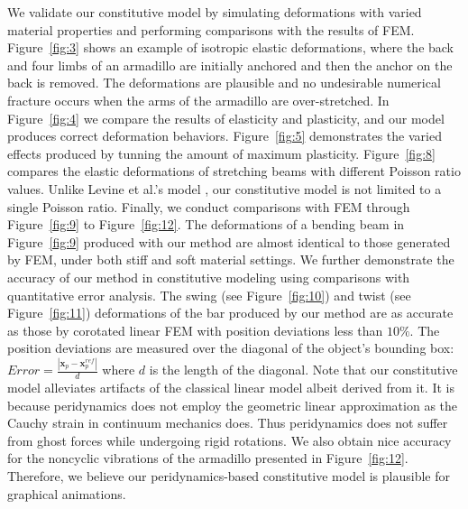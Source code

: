  We validate our constitutive model by simulating deformations with varied material properties and performing comparisons with the results of FEM. Figure~\ref{fig:3} shows an example of isotropic elastic deformations, where the back and four limbs of an armadillo are initially anchored and then the anchor on the back is removed. The deformations are plausible and no undesirable numerical fracture occurs when the arms of the armadillo are over-stretched. In Figure~\ref{fig:4} we compare the results of elasticity and plasticity, and our model produces correct deformation behaviors. Figure~\ref{fig:5} demonstrates the varied effects produced by tunning the amount of maximum plasticity. Figure~\ref{fig:8} compares the elastic deformations of stretching beams with different Poisson ratio values. Unlike Levine et al.'s model \cite{Levine:2015:PPS:2849517.2849526}, our constitutive model is not limited to a single Poisson ratio. Finally, we conduct comparisons with FEM through Figure~\ref{fig:9} to Figure~\ref{fig:12}.
The deformations of a bending beam in Figure~\ref{fig:9} produced with our method are almost identical to those generated by FEM, under both stiff and soft material settings. We further demonstrate the accuracy of our method in constitutive modeling using comparisons with quantitative error analysis. The swing (see Figure~\ref{fig:10}) and twist (see Figure~\ref{fig:11}) deformations of the bar produced by our method are as accurate as those by corotated linear FEM with position deviations less than $10\%$. The position deviations are measured over the diagonal of the object's bounding box: $Error = \frac{|\bm{x}_p-\bm{x}_p^{ref}|}{d}$ where $d$ is the length of the diagonal. Note that our constitutive model alleviates artifacts of the classical linear model albeit derived from it. It is because peridynamics does not employ the geometric linear approximation as the Cauchy strain in continuum mechanics does. Thus peridynamics does not suffer from ghost forces while undergoing rigid rotations. We also obtain nice accuracy for the noncyclic vibrations of the armadillo presented in Figure~\ref{fig:12}. Therefore, we believe our peridynamics-based constitutive model is plausible for graphical animations.

